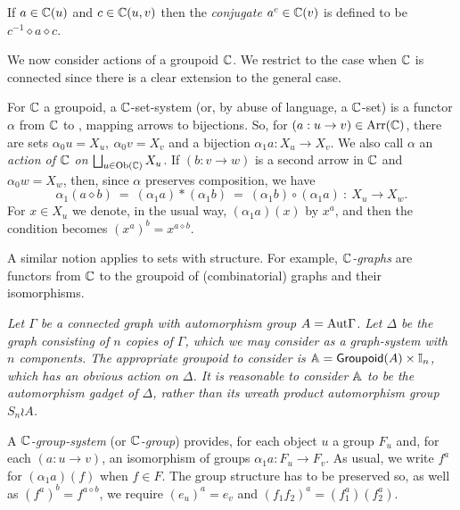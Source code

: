 \medskip
If $a \in \mathbb{C}(u)$ and $c \in \mathbb{C}(u,v)$ then the \emph{conjugate} 
$a^c \in \mathbb{C}(v)$ is defined to be $c^{-1} \diamond a \diamond c$. 

\bigskip
We now consider actions of a groupoid $\mathbb{C}$. 
We restrict to the case when $\mathbb{C}$ is connected 
since there is a clear extension to the general case. 

For $\mathbb{C}$ a groupoid, a $\mathbb{C}$-set-system 
(or, by abuse of language, a $\mathbb{C}$-set) 
is a functor $\alpha$  from $\mathbb{C}$ to \catSet, mapping arrows to bijections.  
So, for $(a : u \to v) \in \mathrm{Arr}(\mathbb{C})$, there are sets 
$\alpha_0u = X_u,~ \alpha_0v = X_v$ 
and a bijection $\alpha_1a : X_u \to X_v$.  
We also call $\alpha$ an 
\emph{action of $\mathbb{C}$ on $\bigsqcup_{u \in \mathrm{Ob}(\mathbb{C})}X_u$}. 
If $(b : v \to w)$ is a second arrow in $\mathbb{C}$ and $\alpha_0w = X_w$,
then, since $\alpha$ preserves composition, we have 
$$
\alpha_1(a \diamond b) ~=~ (\alpha_1a)*(\alpha_1b) 
                       ~=~ (\alpha_1b)\circ(\alpha_1a) ~:~ X_u \to X_w.
$$
For $x \in X_u$ we denote, in the usual way, $(\alpha_1a)(x)$ by $x^a$, 
and then the condition becomes $(x^a)^b = x^{a \diamond b}$. 

\begin{figure}[htbp]
\begin{center}

\label{figure:gpd-sets}
\end{center}
\end{figure}

A similar notion applies to sets with structure. 
For example, \emph{$\mathbb{C}$-graphs} are functors from $\mathbb{C}$ to the groupoid 
of (combinatorial) graphs and their isomorphisms. 

\begin{example}
\emph{
Let $\Gamma$ be a connected graph with automorphism group $A=\mathrm{Aut}\Gamma$. 
Let $\Delta$ be the graph consisting of $n$ copies of $\Gamma$, 
which we may consider as a \emph{graph-system} with $n$ components. 
The appropriate groupoid to consider is $\mathbb{A} = {\sf Groupoid}(A)\times\mathbb{I}_n$, 
which has an obvious action on $\Delta$. 
It is reasonable to consider $\mathbb{A}$ to be 
the automorphism gadget of $\Delta$, 
rather than its wreath product automorphism group $S_n \wr A$. 
}\end{example}

A \emph{$\mathbb{C}$-group-system} (or \emph{$\mathbb{C}$-group}) provides, 
for each object $u$ a group $F_u$ and, for each $(a : u \to v)$, 
an isomorphism of groups  $\alpha_1a : F_u \to F_v$. 
As usual, we write $f^a$ for $(\alpha_1a)(f)$ when $f \in F$. 
The group structure has to be preserved so, 
as well as  $(f^a)^b = f^{a \diamond b}$, 
we require $(e_u)^a = e_v$ and $(f_1f_2)^a = (f_1^a)(f_2^a)$. 

